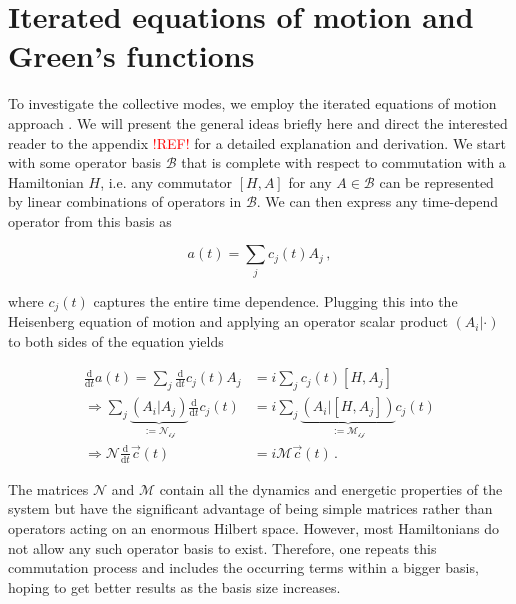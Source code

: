 \documentclass[
    reprint, 
    aps,
    preprintnumbers,
    twocolumn,
    prb,
    superscriptaddress
]{revtex4-2}
\newcommand{\ddt}{\frac{\mathrm{d}}{\mathrm{d}t}}
\begin{document}
\section{Iterated equations of motion and Green's functions}\label{sec:ieom}

To investigate the collective modes, we employ the iterated equations of motion approach \cite{uhrig09,hamerla13,hamerla14,bleicker18}.
We will present the general ideas briefly here and direct the interested reader to the appendix \textcolor{red}{!REF!} for a detailed explanation and derivation.
\newline
We start with some operator basis $\mathcal{B}$ that is complete with respect to commutation with a Hamiltonian $H$, 
i.e. any commutator $[H, A]$ for any $A \in \mathcal{B}$ can be represented by linear combinations of operators in $\mathcal{B}$.
We can then express any time-depend operator from this basis as

\begin{equation}
    a(t) = \sum_j c_j(t) A_j\,,
\end{equation}

where $c_j(t)$ captures the entire time dependence. 
Plugging this into the Heisenberg equation of motion and applying an operator scalar product $(A_i|\cdot)$ to both sides of the equation yields

\begin{equation}
    \label{eqn:heisenberg}
    \begin{aligned}
        \ddt a(t) = \sum_j \ddt c_j(t) A_j &= i \sum_j c_j(t) [H, A_j] \\
        \Rightarrow \sum_j \underbrace{(A_i | A_j)}_{:=\mathcal{N_{ij}}} \ddt c_j(t) &= i \sum_j \underbrace{(A_i | [H, A_j])}_{:=\mathcal{M_{ij}}} c_j(t) \\
        \Rightarrow \mathcal{N} \ddt \vec{c}(t) &= i \mathcal{M} \vec{c}(t)\,.
    \end{aligned}
\end{equation}

The matrices $\mathcal{N}$ and $\mathcal{M}$ contain all the dynamics and energetic properties of the system but have the significant advantage of being simple matrices rather than operators acting on an enormous Hilbert space.
\newline
However, most Hamiltonians do not allow any such operator basis to exist. 
Therefore, one repeats this commutation process and includes the occurring terms within a bigger basis,
hoping to get better results as the basis size increases.
\end{document}
